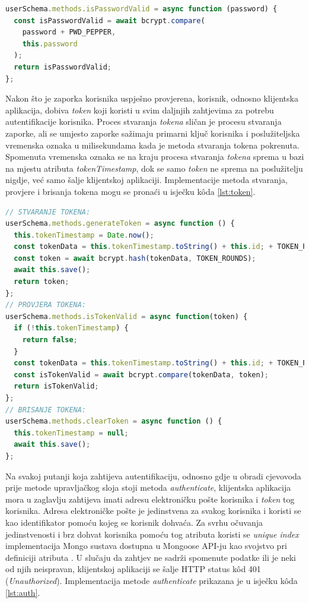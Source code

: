 \documentclass[times, utf8, diplomski, numeric]{fer}
\newcommand{\razmakp}{\vspace{18pt}}
\newcommand{\razmaks}{\vspace{10pt}}
\begin{document}
\razmakp %
\begin{lstlisting}[language=JavaScript, caption={Metoda \emph{isPasswordValid} sheme Korisnik}, label={lst:isPwd}]
userSchema.methods.isPasswordValid = async function (password) {
  const isPasswordValid = await bcrypt.compare(
    password + PWD_PEPPER,
    this.password
  );
  return isPasswordValid;
};
\end{lstlisting}
\razmaks

Nakon što je zaporka korisnika uspješno provjerena, korisnik, odnosno klijentska aplikacija, dobiva \emph{token} koji koristi u svim daljnjih zahtjevima za potrebu autentifikacije korisnika.
Proces stvaranja \emph{tokena} sličan je procesu stvaranja zaporke, ali se umjesto zaporke sažimaju primarni ključ korisnika i poslužiteljska vremenska oznaka  u milisekundama kada je metoda stvaranja tokena pokrenuta.
Spomenuta vremenska oznaka se na kraju procesa stvaranja \emph{tokena} sprema u bazi na mjestu atributa \emph{tokenTimestamp}, dok se samo \emph{token} ne sprema na poslužitelju nigdje, već samo šalje klijentskoj aplikaciji.
Implementacije metoda stvaranja, provjere i brisanja tokena mogu se pronaći u isječku kôda \ref{lst:token}.

\razmakp %
\begin{lstlisting}[language=JavaScript, caption={Metode stvaranja, provjere i brisanja tokena sheme Korisnik}, label={lst:token}]
// STVARANJE TOKENA:
userSchema.methods.generateToken = async function () {
  this.tokenTimestamp = Date.now();
  const tokenData = this.tokenTimestamp.toString() + this.id; + TOKEN_PEPPER;
  const token = await bcrypt.hash(tokenData, TOKEN_ROUNDS);
  await this.save();
  return token;
};
// PROVJERA TOKENA:
userSchema.methods.isTokenValid = async function(token) {
  if (!this.tokenTimestamp) {
    return false;
  }
  const tokenData = this.tokenTimestamp.toString() + this.id; + TOKEN_PEPPER;
  const isTokenValid = await bcrypt.compare(tokenData, token);
  return isTokenValid;
};
// BRISANJE TOKENA:
userSchema.methods.clearToken = async function () {
  this.tokenTimestamp = null;
  await this.save();
};
\end{lstlisting}
\razmaks

Na svakoj putanji koja zahtijeva autentifikaciju, odnosno gdje u obradi cjevovoda prije metode upravljačkog sloja stoji metoda \emph{authenticate}, klijentska aplikacija mora u zaglavlju zahtijeva imati adresu elektroničku pošte korisnika i \emph{token} tog korisnika.
Adresa elektroničke pošte je jedinstvena za svakog korisnika i koristi se kao identifikator pomoću kojeg se korisnik dohvaća.
Za svrhu očuvanja jedinstvenosti i brz dohvat korisnika pomoću tog atributa koristi se \emph{unique index} implementacija Mongo sustava \citep{mongo} dostupna u Mongoose API-ju kao svojstvo pri definiciji atributa \citep{mongoose}.
U slučaju da zahtjev ne sadrži spomenute podatke ili je neki od njih neispravan, klijentskoj aplikaciji se šalje HTTP status kôd 401 (\emph{Unauthorized}).
Implementacija metode \emph{authenticate} prikazana je u isječku kôda \ref{lst:auth}.
\end{document}
